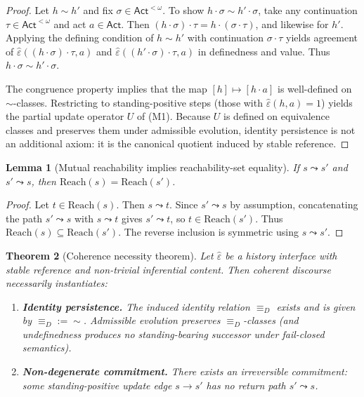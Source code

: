 \documentclass[11pt]{article}
\newtheorem{theorem}{Theorem}[section]
\newtheorem{lemma}[theorem]{Lemma}
\theoremstyle{definition}
\newcommand{\Act}{\mathsf{Act}}
\begin{document}
\begin{proof}
Let $h\sim h'$ and fix $\sigma\in\Act^{<\omega}$.
To show $h\cdot\sigma\sim h'\cdot\sigma$, take any continuation $\tau\in\Act^{<\omega}$ and act $a\in\Act$.
Then $(h\cdot\sigma)\cdot\tau = h\cdot(\sigma\cdot\tau)$, and likewise for $h'$.
Applying the defining condition of $h\sim h'$ with continuation $\sigma\cdot\tau$ yields agreement of
$\hat\varepsilon((h\cdot\sigma)\cdot\tau,a)$ and $\hat\varepsilon((h'\cdot\sigma)\cdot\tau,a)$ in definedness and value.
Thus $h\cdot\sigma\sim h'\cdot\sigma$.

The congruence property implies that the map $[h]\mapsto [h\cdot a]$ is well-defined on $\sim$-classes.
Restricting to standing-positive steps (those with $\hat\varepsilon(h,a)=1$) yields the partial update operator $U$ of (M1).
Because $U$ is defined on equivalence classes and preserves them under admissible evolution, identity persistence is not an additional axiom:
it is the canonical quotient induced by stable reference.
\end{proof}

\begin{lemma}[Mutual reachability implies reachability-set equality]
\label{lem:mutual-reachability}
If $s\leadsto s'$ and $s'\leadsto s$, then $\mathrm{Reach}(s)=\mathrm{Reach}(s')$.
\end{lemma}

\begin{proof}
Let $t\in \mathrm{Reach}(s)$.
Then $s\leadsto t$.
Since $s'\leadsto s$ by assumption, concatenating the path $s'\leadsto s$ with $s\leadsto t$ gives $s'\leadsto t$,
so $t\in\mathrm{Reach}(s')$.
Thus $\mathrm{Reach}(s)\subseteq \mathrm{Reach}(s')$.
The reverse inclusion is symmetric using $s\leadsto s'$.
\end{proof}

\begin{theorem}[Coherence necessity theorem]
\label{thm:coherence-necessity}
Let $\hat\varepsilon$ be a history interface with stable reference and non-trivial inferential content.
Then coherent discourse necessarily instantiates:
\begin{enumerate}[label=\textbf{(C\arabic*)}, leftmargin=2.6em]
\item \textbf{Identity persistence.} The induced identity relation $\equiv_D$ exists and is given by $\equiv_D:=\sim$.
Admissible evolution preserves $\equiv_D$-classes (and undefinedness produces no standing-bearing successor under fail-closed semantics).
\item \textbf{Non-degenerate commitment.} There exists an irreversible commitment: some standing-positive update edge $s\to s'$
has no return path $s'\leadsto s$.
\end{enumerate}
\end{theorem}
\end{document}

